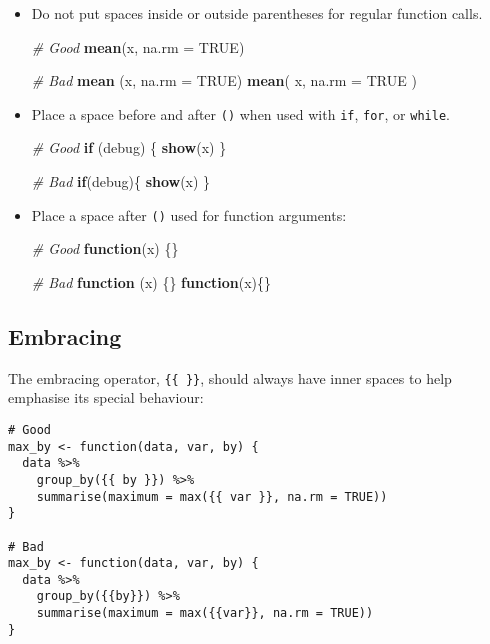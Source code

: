 \documentclass[
]{book}
\newenvironment{Shaded}{\begin{snugshade}}{\end{snugshade}}
\newcommand{\CommentTok}[1]{\textcolor[rgb]{0.56,0.35,0.01}{\textit{#1}}}
\newcommand{\ControlFlowTok}[1]{\textcolor[rgb]{0.13,0.29,0.53}{\textbf{#1}}}
\newcommand{\DataTypeTok}[1]{\textcolor[rgb]{0.13,0.29,0.53}{#1}}
\newcommand{\KeywordTok}[1]{\textcolor[rgb]{0.13,0.29,0.53}{\textbf{#1}}}
\newcommand{\NormalTok}[1]{#1}
\newcommand{\OtherTok}[1]{\textcolor[rgb]{0.56,0.35,0.01}{#1}}
\begin{document}
\begin{itemize}
\item
  Do not put spaces inside or outside parentheses for regular function calls.

\begin{Shaded}
\begin{Highlighting}[]
\CommentTok{# Good}
\KeywordTok{mean}\NormalTok{(x, }\DataTypeTok{na.rm =} \OtherTok{TRUE}\NormalTok{)}

\CommentTok{# Bad}
\KeywordTok{mean}\NormalTok{ (x, }\DataTypeTok{na.rm =} \OtherTok{TRUE}\NormalTok{)}
\KeywordTok{mean}\NormalTok{( x, }\DataTypeTok{na.rm =} \OtherTok{TRUE}\NormalTok{ )}
\end{Highlighting}
\end{Shaded}
\item
  Place a space before and after \texttt{()} when used with \texttt{if}, \texttt{for}, or \texttt{while}.

\begin{Shaded}
\begin{Highlighting}[]
\CommentTok{# Good}
\ControlFlowTok{if}\NormalTok{ (debug) \{}
    \KeywordTok{show}\NormalTok{(x)}
\NormalTok{\}}

\CommentTok{# Bad}
\ControlFlowTok{if}\NormalTok{(debug)\{}
    \KeywordTok{show}\NormalTok{(x)}
\NormalTok{\}}
\end{Highlighting}
\end{Shaded}
\item
  Place a space after \texttt{()} used for function arguments:

\begin{Shaded}
\begin{Highlighting}[]
\CommentTok{# Good}
\ControlFlowTok{function}\NormalTok{(x) \{\}}

\CommentTok{# Bad}
\ControlFlowTok{function}\NormalTok{ (x) \{\}}
\ControlFlowTok{function}\NormalTok{(x)\{\}}
\end{Highlighting}
\end{Shaded}
\end{itemize}

\hypertarget{embracing}{%
\subsection{Embracing}\label{embracing}}

The embracing operator, \texttt{\{\{\ \}\}}, should always have inner spaces to help
emphasise its special behaviour:

\begin{verbatim}
# Good
max_by <- function(data, var, by) {
  data %>%
    group_by({{ by }}) %>%
    summarise(maximum = max({{ var }}, na.rm = TRUE))
}

# Bad
max_by <- function(data, var, by) {
  data %>%
    group_by({{by}}) %>%
    summarise(maximum = max({{var}}, na.rm = TRUE))
}
\end{verbatim}
\end{document}
